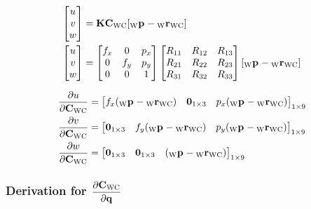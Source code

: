 \begin{align}
  \begin{bmatrix} u \\ v \\ w \end{bmatrix}
    &= \Mat{K} \camRot [\Pt{\world} - \camPos]
    \nonumber \\
  \begin{bmatrix} u \\ v \\ w \end{bmatrix}
  &= \begin{bmatrix}
      f_x & 0 & p_x \\
      0 & f_y & p_y \\
      0 & 0 & 1
  \end{bmatrix}
  \begin{bmatrix}
      R_{11} & R_{12} & R_{13} \\
      R_{21} & R_{22} & R_{23} \\
      R_{31} & R_{32} & R_{33}
  \end{bmatrix}
  [\Pt{\world} - \camPos]
  \nonumber
\end{align}

\begin{align}
  \dfrac{\partial{u}}{\partial{\camRot}} &=
      \begin{bmatrix}
        f_{x} (\Pt{\world} - \camPos) &
        \Zeros{1}{3} &
        p_{x} (\Pt{\world} - \camPos)
      \end{bmatrix}_{1 \times 9} \\
  \dfrac{\partial{v}}{\partial{\camRot}} &=
    \begin{bmatrix}
      \Zeros{1}{3} &
      f_{y} (\Pt{\world} - \camPos) &
      p_{y} (\Pt{\world} - \camPos)
  \end{bmatrix}_{1 \times 9} \\
  \dfrac{\partial{w}}{\partial{\camRot}} &=
    \begin{bmatrix}
      \Zeros{1}{3} &
      \Zeros{1}{3} &
      (\Pt{\world} - \camPos)
    \end{bmatrix}_{1 \times 9}
\end{align}


\subsubsection*{Derivation for \color{cyan}
$\dfrac{\partial{\camRot}}{\partial{\quat}}$}

